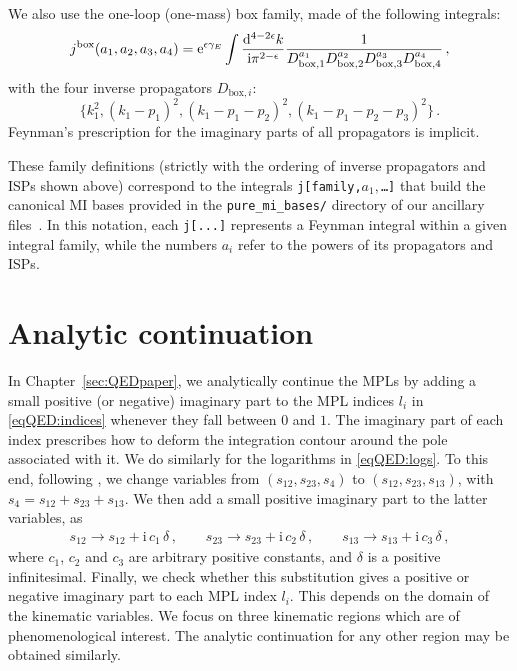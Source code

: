 \documentclass[main.tex]{subfiles}
\begin{document}
%
We also use the one-loop (one-mass) box family, made of the following integrals:
\begin{equation}
	j^{\rm box}(a_1, a_2, a_3, a_4) = \mathrm{e}^{\epsilon \gamma_{E}} \int \frac{\mathrm{d}^{4-2\epsilon} k}{\mathrm{i} \pi^{2-\epsilon}} \frac{1}{D_{\mathrm{box}, 1}^{a_1} D_{\mathrm{box},2}^{a_2} D_{\mathrm{box},3}^{a_3} D_{\mathrm{box},4}^{a_4}} \,,
\end{equation}
with the four inverse propagators $D_{\mathrm{box},i}$:
	\begin{equation}
		\big\{k_1^2, (k_1-p_1)^2, (k_1-p_1-p_2)^2, (k_1-p_1-p_2-p_3)^2 \big\} \,.
	\end{equation}
Feynman's prescription for the imaginary parts of all propagators is implicit.

These family definitions (strictly with the ordering of inverse propagators and ISPs shown above) correspond to the integrals \texttt{j[family,$a_1,$\ldots]} that build the canonical MI bases provided in the \texttt{pure\_mi\_bases/} directory of our ancillary files~\cite{zenodo}. In this notation, each \texttt{j[...]} represents a Feynman integral within a given integral family, while the numbers $a_i$ refer to the powers of its propagators and ISPs.

\renewcommand{\theequation}{G.\arabic{equation}}
\chapter{Analytic continuation} \label{app:an_cont}
In Chapter~\ref{sec:QEDpaper}, we analytically continue the MPLs by adding a small positive (or negative) imaginary part to the MPL indices $l_i$ in \cref{eqQED:indices} whenever they fall between $0$ and $1$. The imaginary part of each index prescribes how to deform the integration contour around the pole associated with it. We do similarly for the logarithms in \cref{eqQED:logs}.
To this end, following , we change variables from $(s_{12},s_{23},s_4)$ to $(s_{12},s_{23},s_{13})$, with $s_4 = s_{12} + s_{23} + s_{13}$. We then add a small positive imaginary part to the latter variables, as
\begin{align} \label{eq:add_im}
s_{12} \longrightarrow s_{12} + \mathrm{i} \, c_{1} \, \delta \, , \qquad
s_{23} \longrightarrow s_{23} + \mathrm{i} \, c_{2} \, \delta  \, , \qquad
s_{13} \longrightarrow s_{13} + \mathrm{i} \, c_{3} \, \delta  \, , 
\end{align}
where $c_{1}$, $c_{2}$ and $c_{3}$ are arbitrary positive constants, and $\delta$ is a positive infinitesimal. 
Finally, we check whether this substitution gives a positive or negative imaginary part to each MPL index $l_i$.
This depends on the domain of the kinematic variables.
We focus on three kinematic regions which are of phenomenological interest. The analytic continuation for any other region may be obtained similarly.
\end{document}
